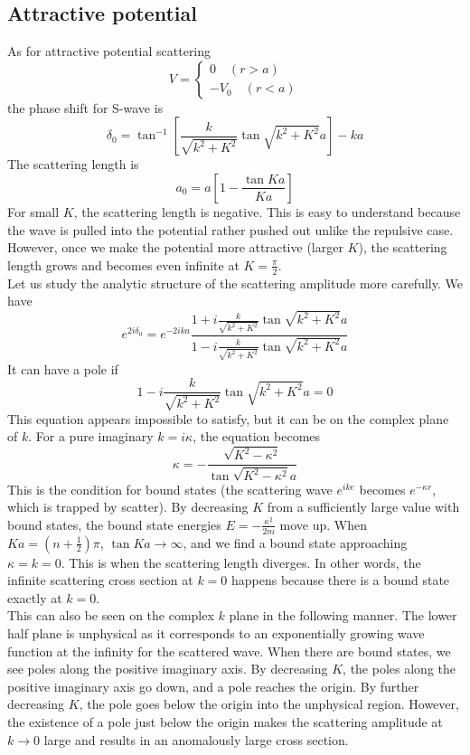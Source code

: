 \subsection{Attractive potential}
As for attractive potential scattering
\[V = \begin{cases} 0 \quad (r > a) \\ -V_0 \quad (r < a)\end{cases}\]
the phase shift for S-wave is
\[\delta_0 = \tan^{-1} \left[\frac{k}{\sqrt{k^2+K^2}} \tan\sqrt{k^2+K^2}a \right]-ka\]
The scattering length is
\[a_0 = a\left[ 1 - \frac{\tan Ka}{Ka} \right] \]
For small $K$, the scattering length is negative. This is easy to understand because the wave is pulled into the potential rather pushed out unlike the repulsive case. However, once we
make the potential more attractive (larger $K$), the scattering length grows and becomes even infinite at $K = \frac{\pi}{2}$.
\\
Let us study the analytic structure of the scattering amplitude more carefully. We have
\[e^{2i\delta_0} = e^{-2ika} \frac{1 + i \frac{k}{\sqrt{k^2+K^2}} \tan\sqrt{k^2+K^2}a}{1 - i \frac{k}{\sqrt{k^2+K^2}} \tan\sqrt{k^2+K^2}a}\]
It can have a pole if
\[1 - i \frac{k}{\sqrt{k^2+K^2}} \tan\sqrt{k^2+K^2}a = 0\]
This equation appears impossible to satisfy, but it can be on the complex plane of $k$. For a pure imaginary $k = i\kappa$, the equation becomes
\[\kappa = - \frac{\sqrt{K^2-\kappa^2}}{\tan \sqrt{K^2-\kappa^2}a}\]
This is the condition for bound states (the scattering wave $e^{ike}$ becomes $e^{-\kappa r}$, which is trapped by scatter). By decreasing $K$ from a sufficiently large value with bound states, the bound state energies $E = -\frac{\kappa^2}{2m}$ move up. When $Ka = (n + \frac{1}{2})\pi$, $\tan Ka \to \infty$, and we find a bound state approaching $\kappa = k = 0$. 
This is when the scattering length diverges. In other words, the infinite scattering cross section at $k = 0$ happens because there is a bound state exactly at $ k = 0$.\\
This can also be seen on the complex $k$ plane in the following manner. The lower half plane is unphysical as it corresponds to an exponentially growing wave function at the infinity for the scattered wave. 
When there are bound states, we see poles along the positive imaginary axis. By decreasing $K$, the poles along the positive imaginary axis go down, and a pole reaches the origin. 
By further decreasing $K$, the pole goes below the origin into the unphysical region. 
However, the existence of a pole just below the origin makes the scattering amplitude at $k \to 0$ large and results in an anomalously large cross section. 

